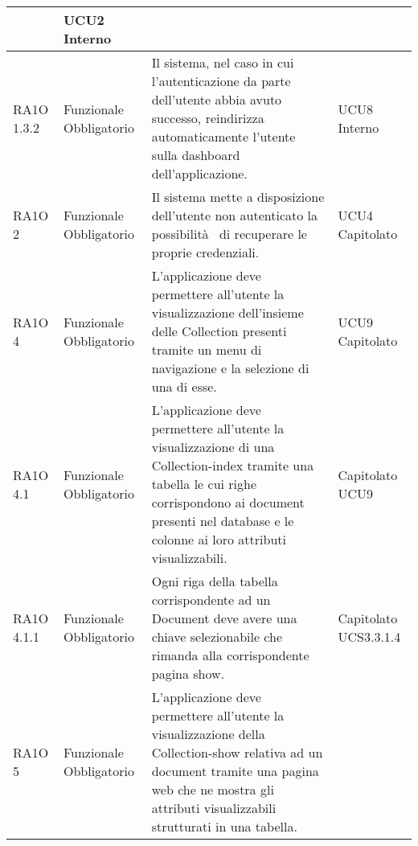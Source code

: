 \begin{center}
\begin{longtable}{ | l | p{2cm} | p{5cm} | p{1.7cm} |}
 &  UCU2 \newline  Interno \newline  \\ \hline      
        RA1O 1.3.2 & Funzionale \newline  Obbligatorio  & Il sistema, nel caso in cui l'autenticazione da parte dell'utente abbia avuto successo, reindirizza automaticamente l'utente sulla dashboard dell'applicazione.
 &  UCU8 \newline  Interno \newline  \\ \hline      
        RA1O 2  & Funzionale \newline  Obbligatorio  & Il sistema mette a disposizione dell'utente non autenticato la possibilità  di recuperare le proprie credenziali. &  UCU4 \newline  Capitolato \newline  \\ \hline      
        RA1O 4 & Funzionale \newline  Obbligatorio  & L'applicazione deve permettere all'utente la visualizzazione dell'insieme delle Collection presenti tramite un menu di navigazione e la selezione di una di esse. &  UCU9 \newline  Capitolato \newline  \\ \hline      
        RA1O 4.1  & Funzionale \newline  Obbligatorio  & L'applicazione deve permettere all'utente la visualizzazione di una Collection-index tramite una tabella le cui righe corrispondono ai document presenti nel database e le colonne ai loro attributi visualizzabili.  &  Capitolato \newline  UCU9 \newline  \\ \hline      
        RA1O 4.1.1  & Funzionale \newline  Obbligatorio  & Ogni riga della tabella corrispondente ad un Document deve avere una chiave selezionabile che rimanda alla corrispondente pagina show. &  Capitolato \newline  UCS3.3.1.4 \newline  \\ \hline      
        RA1O 5  & Funzionale \newline  Obbligatorio  & L'applicazione deve permettere all'utente la visualizzazione della Collection-show relativa ad un document tramite una pagina web che ne mostra gli attributi visualizzabili strutturati in una tabella.

\end{longtable}
\end{center}
